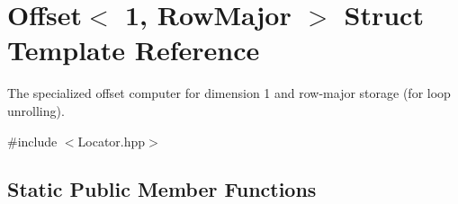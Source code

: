 \hypertarget{struct_d_o_1_1_offset_3_011_00_01_row_major_01_4}{\section{Offset$<$ 1, Row\-Major $>$ Struct Template Reference}
\label{struct_d_o_1_1_offset_3_011_00_01_row_major_01_4}
}


The specialized offset computer for dimension 1 and row-\/major storage (for loop unrolling).  




{\ttfamily \#include $<$Locator.\-hpp$>$}

\subsection*{Static Public Member Functions}
